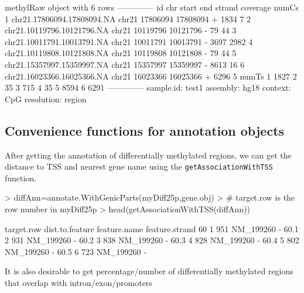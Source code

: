 \documentclass{article}
\begin{document}
\begin{Schunk}
\begin{Soutput}
methylRaw object with 6 rows
--------------
                          id   chr    start      end strand coverage numCs
1 chr21.17806094.17808094.NA chr21 17806094 17808094      +     1834     7
2 chr21.10119796.10121796.NA chr21 10119796 10121796      -       79    44
3 chr21.10011791.10013791.NA chr21 10011791 10013791      -     3697  2982
4 chr21.10119808.10121808.NA chr21 10119808 10121808      -       79    44
5 chr21.15357997.15359997.NA chr21 15357997 15359997      -     8613    16
6 chr21.16023366.16025366.NA chr21 16023366 16025366      +     6296     5
  numTs
1  1827
2    35
3   715
4    35
5  8594
6  6291
--------------
sample.id: test1 
assembly: hg18 
context: CpG 
resolution: region 
\end{Soutput}
\end{Schunk}



\subsection{Convenience functions for annotation objects}
After getting the annotation of differentially methylated regions, we can get the distance to TSS and nearest gene name using the \texttt{getAssociationWithTSS} function.

\begin{Schunk}
\begin{Sinput}
> diffAnn=annotate.WithGenicParts(myDiff25p,gene.obj)
> # target.row is the row number in myDiff25p
> head(getAssociationWithTSS(diffAnn))
\end{Sinput}
\begin{Soutput}
     target.row dist.to.feature feature.name feature.strand
60            1             951    NM_199260              -
60.1          2             931    NM_199260              -
60.2          3             838    NM_199260              -
60.3          4             828    NM_199260              -
60.4          5             802    NM_199260              -
60.5          6             723    NM_199260              -
\end{Soutput}
\end{Schunk}

It is also desirable to get percentage/number of differentially methylated regions that overlap with intron/exon/promoters
\end{document}
